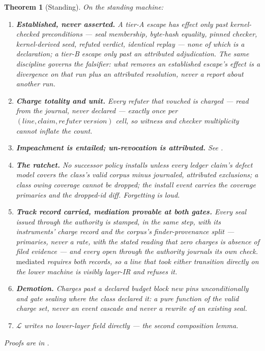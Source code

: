 \documentclass[11pt,a4paper]{article}
\theoremstyle{plain}
\newtheorem{theorem}{Theorem}
\theoremstyle{definition}
\theoremstyle{remark}
\begin{document}
\begin{theorem}[Standing]
\label{thm:standing}
On the standing machine:
\begin{enumerate}[label=\textup{C\arabic*},leftmargin=2.4em,itemsep=1pt]
  \item \textbf{Established, never asserted.} A tier-A escape has effect only past kernel-checked preconditions --- seal membership, byte-hash equality, pinned checker, kernel-derived seed, refuted verdict, identical replay --- none of which is a declaration; a tier-B escape only past an attributed adjudication. The same discipline governs the falsifier: what removes an established escape's effect is a divergence on \emph{that} run plus an attributed resolution, never a report about another run.
  \item \textbf{Charge totality and unit.} Every refuter that vouched is charged --- read from the journal, never declared --- exactly once per $(\mathit{line}, \mathit{claim}, \mathit{refuter\ version})$ cell, so witness and checker multiplicity cannot inflate the count.
  \item \textbf{Impeachment is entailed; un-revocation is attributed.} See .
  \item \textbf{The ratchet.} No successor policy installs unless every ledger claim's defect model covers the class's valid corpus minus journaled, attributed exclusions; a class owing coverage cannot be dropped; the install event carries the coverage primaries and the dropped-id diff. Forgetting is loud.
  \item \textbf{Track record carried, mediation provable at both gates.} Every seal issued through the authority is stamped, in the same step, with its instruments' charge record and the corpus's finder-provenance split --- primaries, never a rate, with the stated reading that zero charges is absence of filed evidence --- and every open through the authority journals its own check. $\mathrm{mediated}$ requires both records, so a line that took either transition directly on the lower machine is visibly layer-IR and  refuses it.
  \item[C6] \textbf{Demotion.} Charges past a declared budget block new pins unconditionally and gate sealing where the class declared it: a pure function of the valid charge set, never an event cascade and never a rewrite of an existing seal.
  \item[C7] $\mathcal{L}$ writes no lower-layer field directly --- the second composition lemma.
\end{enumerate}
Proofs are in .
\end{theorem}
\end{document}
